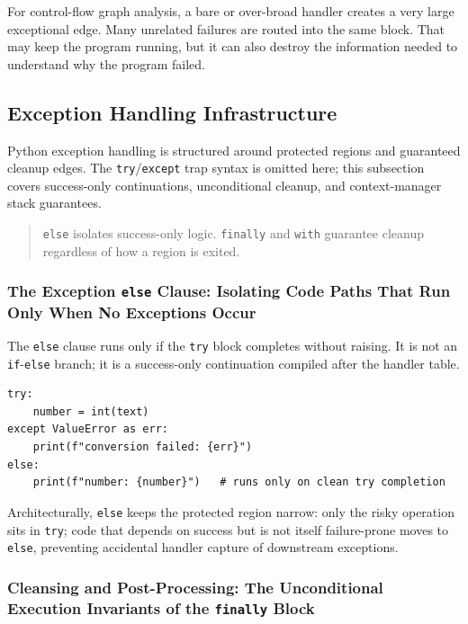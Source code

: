 \documentclass[a4paper,twoside]{report}
\begin{document}
For control-flow graph analysis, a bare or over-broad handler creates a very large exceptional edge. Many unrelated failures are routed into the same block. That may keep the program running, but it can also destroy the information needed to understand why the program failed.

\subsection{Exception Handling Infrastructure}

Python exception handling is structured around protected regions and guaranteed cleanup edges. The \texttt{try}/\texttt{except} trap syntax is omitted here; this subsection covers success-only continuations, unconditional cleanup, and context-manager stack guarantees.

\begin{quote}
\texttt{else} isolates success-only logic. \texttt{finally} and \texttt{with} guarantee cleanup regardless of how a region is exited.
\end{quote}

\subsubsection{The Exception \texttt{else} Clause: Isolating Code Paths That Run Only When No Exceptions Occur}

The \texttt{else} clause runs only if the \texttt{try} block completes without raising. It is not an \texttt{if}-\texttt{else} branch; it is a success-only continuation compiled after the handler table.

\begin{verbatim}
try:
    number = int(text)
except ValueError as err:
    print(f"conversion failed: {err}")
else:
    print(f"number: {number}")   # runs only on clean try completion
\end{verbatim}

Architecturally, \texttt{else} keeps the protected region narrow: only the risky operation sits in \texttt{try}; code that depends on success but is not itself failure-prone moves to \texttt{else}, preventing accidental handler capture of downstream exceptions.

\subsubsection{Cleansing and Post-Processing: The Unconditional Execution Invariants of the \texttt{finally} Block}
\end{document}
